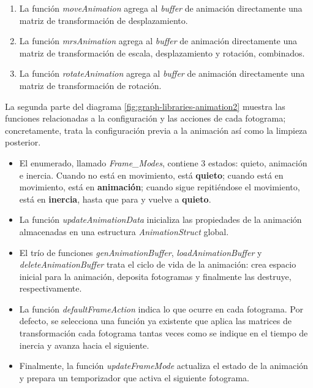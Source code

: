 \begin{itemize}
\begin{enumerate}
        \item La función \textit{moveAnimation} agrega al \textit{buffer} de animación directamente una matriz de transformación de desplazamiento.
        
        \item La función \textit{mrsAnimation} agrega al \textit{buffer} de animación directamente una matriz de transformación de escala, desplazamiento y rotación, combinados.
        
        \item La función \textit{rotateAnimation} agrega al \textit{buffer} de animación directamente una matriz de transformación de rotación.
    \end{enumerate}
    
\end{itemize}

La segunda parte del diagrama \ref{fig:graph-libraries-animation2} muestra las funciones relacionadas a la configuración y las acciones de cada fotograma; concretamente, trata la configuración previa a la animación así como la limpieza posterior.

\begin{itemize}
    \item El enumerado, llamado \textit{Frame\_Modes}, contiene 3 estados: quieto, animación e inercia. Cuando no está en movimiento, está \textbf{quieto}; cuando está en movimiento, está en \textbf{animación}; cuando sigue repitiéndose el movimiento, está en \textbf{inercia}, hasta que para y vuelve a \textbf{quieto}.

    \item La función \textit{updateAnimationData} inicializa las propiedades de la animación almacenadas en una estructura \textit{AnimationStruct} global.

    \item El trío de funciones \textit{genAnimationBuffer}, \textit{loadAnimationBuffer} y \textit{deleteAnimationBuffer} trata el ciclo de vida de la animación: crea espacio inicial para la animación, deposita fotogramas y finalmente las destruye, respectivamente.
    
    \item La función \textit{defaultFrameAction} indica lo que ocurre en cada fotograma. Por defecto, se selecciona una función ya existente que aplica las matrices de transformación cada fotograma tantas veces como se indique en el tiempo de inercia y avanza hacia el siguiente.

    \item Finalmente, la función \textit{updateFrameMode} actualiza el estado de la animación y prepara un temporizador que activa el siguiente fotograma.
\end{itemize}

